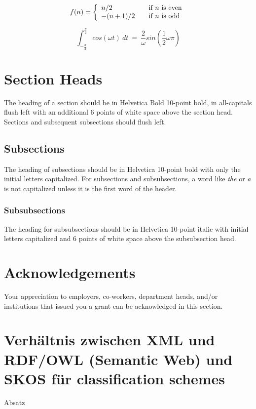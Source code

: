 	\begin{equation}
		f(n) = \left\{ 
			\begin{array}{l l}
			n/2 & \quad \text{if $n$ is even}\\
			-(n+1)/2 & \quad \text{if $n$ is odd}\\
		\end{array} \right.
		\label{myequation}
	\end{equation}
	
	\begin{equation}
		\int_{- \frac{\pi}{2}}^{\frac{\pi}{2}}cos(\omega t)~dt
		~=~
		\frac{2}{\omega}sin( \frac{1}{2}\omega \pi)
		\label{myequation2}
	\end{equation}
	
	\section{Section Heads}
	The heading of a section should be in Helvetica Bold 10-point bold, in
	all-capitals flush left with an additional 6 points of white space above
	the section head. Sections and subsequent subsections should flush left.
	
	\subsection{Subsections}
	The heading of subsections should be in Helvetica 10-point bold with
	only the initial letters capitalized. For subsections and subsubsections,
	a word like \emph{the} or \emph{a} is not capitalized unless it is the
	first word of the header.
	
	\subsubsection{Subsubsections}
	The heading for subsubsections should be in Helvetica 10-point italic
	with initial letters capitalized and 6 points of white space above the
	subsubsection head.
	
	\section{Acknowledgements}
	Your appreciation to employers, co-workers, department heads, and/or
	institutions that issued you a grant can be acknowledged in this section.
	
	\newpage
	
	\section{Verhältnis zwischen XML und RDF/OWL (Semantic Web) und SKOS für classification schemes}
	Absatz

